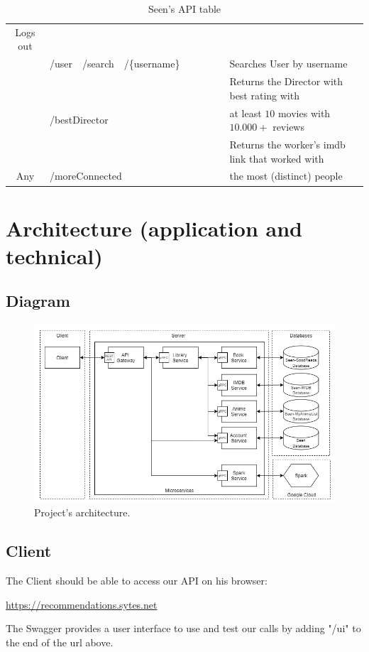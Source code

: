 \documentclass[oneside]{article}
\newcommand{\xmark}{\ding{53}} %
\newcommand*\fpar{\hspace{1ex}}
\begin{document}
\begin{table}[H]
\begin{adjustbox}{width=1.4\textwidth}
\begin{tabular}{ c|l l l l|c|c|c|c|l }
    Logs out
    \\ \hhline{-|----|-|-|-|-|~}
    & /user & /search & \multicolumn{2}{l|}{/\{username\}} &
    \xmark & & & &
    Searches User by username
    \\ 
    & \multicolumn{4}{l|}{} &
     & & & &
    Returns the Director with best rating with \\
    & \multicolumn{4}{l|}{\multirow{-2}{*}{/bestDirector}} &
    \multirow{-2}{*}{\xmark}
     & & & &
    at least $10$ movies with $10.000+$ reviews
    \\ 
    & \multicolumn{4}{l|}{} &
     & & & &
    Returns the worker's imdb link that worked with \\
    \multirow{-5}{*}{Any} 
    & \multicolumn{4}{l|}{\multirow{-2}{*}{/moreConnected}} &
    \multirow{-2}{*}{\xmark} & & & &
    the most (distinct) people
  \end{tabular}
  \end{adjustbox}
  \caption{Seen's API table}
\end{table}

\section{Architecture (application and technical)}
\label{sec:architecture}
  \subsection{Diagram}
  \begin{figure}[H]
    \centering
    \includegraphics[width=\textwidth]{ CloudNativeAppArchitecture.png }
    \caption{Project's architecture.}
    \label{img:architecture}
  \end{figure}

  \subsection{Client}
  \fpar The Client should be able to access our API on his browser:
  \begin{center}
    \url{https://recommendations.sytes.net}
  \end{center}
  \par The Swagger provides a user interface to use and test our calls by adding "/ui" to the end of the url above.
\end{document}
